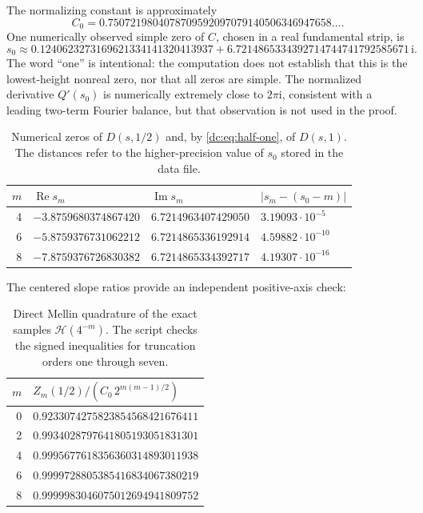 \documentclass[11pt,a4paper,oneside,openany]{book}
\numberwithin{equation}{chapter}
\theoremstyle{definition}
\theoremstyle{remark}
\newcommand{\ii}{\mathrm i}
\newcommand{\abs}[1]{\left\lvert #1\right\rvert}
\DeclareMathOperator{\Rea}{Re}
\DeclareMathOperator{\Ima}{Im}
\newcommand{\calH}{\mathcal H}
\begin{document}
The normalizing constant is approximately
\begin{equation}
 C_0=0.7507219804078709592097079140506346947658\ldots.
 \label{dc:eq:C0-numeric}
\end{equation}
One numerically observed simple zero of $C$, chosen in a real
fundamental strip, is
\begin{equation}
 s_0\approx
 0.1240623273169621334141320413937
 +6.7214865334392714744741792585671\,\ii.
 \label{dc:eq:s0-numeric}
\end{equation}
The word ``one'' is intentional: the computation does not establish
that this is the lowest-height nonreal zero, nor that all zeros are
simple. The normalized derivative $Q'(s_0)$ is numerically extremely
close to $2\pi\ii$, consistent with a leading two-term Fourier
balance, but that observation is not used in the proof.

\begin{table}[ht]
\centering\small
\begin{tabular}{@{}rlll@{}}
\toprule
$m$&$\Rea s_m$&$\Ima s_m$&$\abs{s_m-(s_0-m)}$\\
\midrule
4&$-3.8759680374867420$&$6.7214963407429050$&$3.19093\cdot10^{-5}$\\
6&$-5.8759376731062212$&$6.7214865336192914$&$4.59882\cdot10^{-10}$\\
8&$-7.8759376726830382$&$6.7214865334392717$&$4.19307\cdot10^{-16}$\\
\bottomrule
\end{tabular}
\caption{Numerical zeros of $D(s,1/2)$ and, by
\cref{dc:eq:half-one}, of $D(s,1)$. The distances refer to the
higher-precision value of $s_0$ stored in the data file.}
\label{dc:tab:zeros}
\end{table}

The centered slope ratios provide an independent positive-axis
check:
\begin{table}[ht]
\centering
\begin{tabular}{@{}rl@{}}
\toprule
$m$&$Z_m(1/2)/(C_0\,2^{m(m-1)/2})$\\
\midrule
0&$0.9233074275823854568421676411$\\
2&$0.9934028797641805193051831301$\\
4&$0.9995677618356360314893011938$\\
6&$0.9999728805385416834067380219$\\
8&$0.9999983046075012694941809752$\\
\bottomrule
\end{tabular}
\caption{Direct Mellin quadrature of the exact samples
$\calH(4^{-m})$. The script checks the signed inequalities for
truncation orders one through seven.}
\label{dc:tab:ratios}
\end{table}
\end{document}
